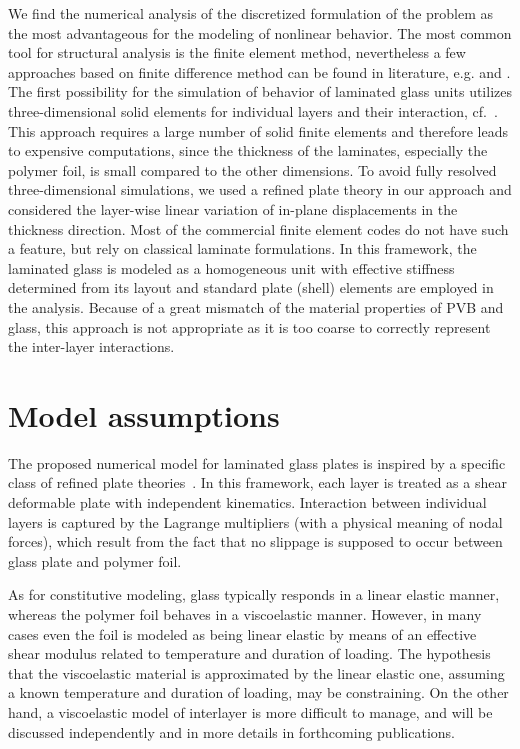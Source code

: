 \documentclass[11pt]{article}
\begin{document}
We find the numerical analysis of the discretized formulation of the problem as the most advantageous for the modeling of nonlinear behavior. The most common tool for structural analysis is the finite element method, nevertheless a few approaches based on finite difference method can be found in literature, e.g. \cite{Vallabhan:1993:ALG} and \cite{Asik:2003:LGP}.
The first possibility for the simulation of behavior of laminated glass units utilizes three-dimensional solid elements for individual layers and their interaction, cf.~\citep{Duser:1999:AGBL}. This approach requires a large number of solid finite elements and therefore leads to expensive computations, since the thickness of the laminates, especially the polymer foil, is small compared to the other dimensions. 
To avoid fully resolved three-dimensional simulations, we used a refined plate theory in our approach and considered the layer-wise linear variation of in-plane displacements in the thickness direction. Most of the commercial finite element codes do not have such a feature, but rely on classical laminate formulations. In this framework, the laminated glass is modeled as a homogeneous unit with effective stiffness determined from its layout and standard plate (shell) elements are employed in the analysis. Because of a great mismatch of the material properties of PVB and glass, this approach is not appropriate as it is too coarse to correctly represent the inter-layer interactions. 



\section{Model assumptions}\label{sec:assumptions}


The proposed numerical model for laminated glass plates is inspired by a specific class of refined plate theories~\citep{Mau:1973:RLP,Sejnoha:1996:MMU,Kruis:2002:SLP}. In this framework, each layer is treated as a shear deformable plate with independent kinematics. Interaction between individual layers is captured by the Lagrange multipliers (with a physical meaning of nodal forces), which result from the fact that no slippage is supposed to occur between glass plate and polymer foil. 

As for constitutive modeling, glass typically responds in a linear elastic manner, whereas the polymer foil behaves in a viscoelastic manner.  However, in many cases even the foil is modeled as being linear elastic by means of an effective shear modulus related to temperature and duration of loading. The hypothesis that the viscoelastic material is approximated by the linear elastic one, assuming a known temperature and duration of loading, may be constraining. On the other hand, a viscoelastic model of interlayer is more difficult to manage, and will be discussed independently and in more details in forthcoming publications.
\end{document}
